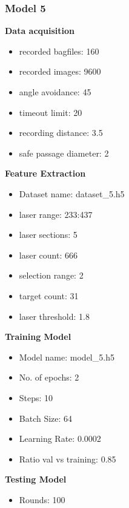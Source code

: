 \subsubsection{Model 5\label{model_5} }
\begin{multicols}{2}\textbf{Data acquisition}
\begin{itemize}
\setlength\itemsep{0.1em}
\item recorded bagfiles: 160
\item recorded images: 9600
\item angle avoidance: 45
\item timeout limit: 20
\item recording distance: 3.5
\item safe passage diameter: 2
\end{itemize}
\textbf{Feature Extraction}
\begin{itemize}
\setlength\itemsep{0.1em}
\item Dataset name: dataset\_5.h5
\item  laser range: 233:437
\item  laser sections: 5
\item  laser count: 666
\item  selection range: 2
\item  target count: 31
\item  laser threshold: 1.8
\end{itemize}
\columnbreak\textbf{Training Model}
\begin{itemize}
\setlength\itemsep{0.1em}
\item  Model name: model\_5.h5
\item  No. of epochs: 2
\item  Steps: 10
\item  Batch Size: 64
\item  Learning Rate: 0.0002
\item  Ratio val vs training: 0.85
\end{itemize}
\textbf{Testing Model}
\begin{itemize}
\setlength\itemsep{0.1em}
\item Rounds: 100
\newline
\newline
\newline
\newline
\newline
\newline
\newline
\newline
\end{itemize}

\end{multicols}
